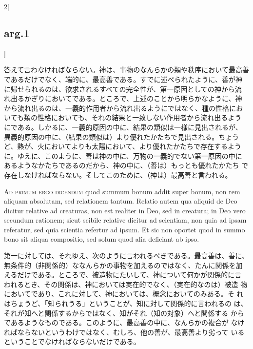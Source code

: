 \documentclass[paper=a4paper,fontsize=10pt,jafontsize=9pt,titlepage]{jlreq}
\begin{document}
\begin{paracol}{2}[\subsection{arg.1}]
\switchcolumn

答えて言わなければならない。神は、事物のなんらかの類や秩序において最高善
 であるだけでなく、端的に、最高善である。すでに述べられたように、善が神
 に帰せられるのは、欲求されるすべての完全性が、第一原因としての神から流
 れ出るかぎりにおいてである。ところで、上述のことから明らかなように、神
 から流れ出るのは、一義的作用者から流れ出るようにではなく、種の性格にお
 いても類の性格においても、それの結果と一致しない作用者から流れ出るよう
 にである。しかるに、一義的原因の中に、結果の類似は一様に見出されるが、
 異義的原因の中に、（結果の類似は）より優れたかたちで見出される。ちょう
 ど、熱が、火においてよりも太陽において、より優れたかたちで存在するよう
 に。ゆえに、このように、善は神の中に、万物の一義的でない第一原因の中に
 あるようなかたちであるのだから、神の中に、（善は）もっとも優れたかたち
 で存在しなければならない。そしてこのために、（神は）最高善と言われる。

\switchcolumn*[\subsection{ad.1}]

{\scshape Ad primum ergo dicendum} quod summum bonum addit super bonum, non rem
 aliquam absolutam, sed relationem tantum. Relatio autem qua aliquid de
 Deo dicitur relative ad creaturas, non est realiter in Deo, sed in
 creatura; in Deo vero secundum rationem; sicut scibile relative dicitur
 ad scientiam, non quia ad ipsam referatur, sed quia scientia refertur
 ad ipsum. Et sic non oportet quod in summo bono sit aliqua compositio,
 sed solum quod alia deficiant ab ipso.

\switchcolumn

第一に対しては、それゆえ、次のように言われるべきである。最高善は、善に、
 無条件的（非関係的）ななんらかの事物を加えるのではなく、たんに関係を加
 えるだけである。ところで、被造物にたいして、神について何かが関係的に言
 われるとき、その関係は、神においては実在的でなく、（実在的なのは）被造
 物においてであり、これに対して、神においては、概念においてのみある。そ
 れはちょうど、「知られうる」ということが、知に対して関係的に言われるの
 は、それが知へと関係するからではなく、知がそれ（知の対象）へと関係する
 からであるようなものである。このように、最高善の中に、なんらかの複合が
 なければならないというわけではなく、むしろ、他の善が、最高善より劣って
 いるということでなければならないだけである。

\switchcolumn*[\subsection{ad.2}]


\end{paracol}
\end{document}
